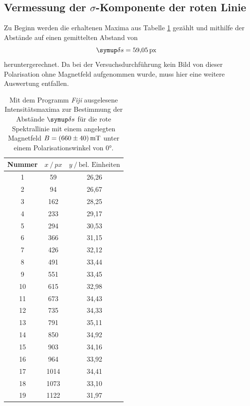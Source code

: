 \subsection{Vermessung der \texorpdfstring{$\sigma$}{sigma}-Komponente der roten Linie}
Zu Beginn werden die erhaltenen Maxima aus Tabelle \ref{tab:sigmarot660mT} gezählt und mithilfe der Abstände auf einen gemittelten Abstand von
\begin{equation}
\deltaup s= \SI{59,05}{px}
\end{equation}
heruntergerechnet. Da bei der Versuchsdurchführung kein Bild von dieser Polarisation ohne Magnetfeld aufgenommen wurde, muss hier eine weitere Auswertung entfallen.

\begin{table}[H]
  \centering
  \caption{Mit dem Programm \textit{Fiji} \cite{Fiji} ausgelesene Intensitätsmaxima zur Bestimmung der Abstände $\deltaup s$ für die rote Spektrallinie mit einem angelegten Magnetfeld $B=\SI{660 \pm 40}{\milli\tesla}$  unter einem Polarisationswinkel von $0°$.}
  \label{tab:sigmarot660mT}
  \begin{tabular}{c|cc}
    \toprule
    {Nummer} & {$x \:/\: \si{px}$} & {$y \:/\: \text{bel. Einheiten}$}\\
    \midrule
 1 &   59  &	 26,26 \\
 2 &   94  &	 26,67 \\
 3 &  162  &	 28,25 \\
 4 &  233  &	 29,17 \\
 5 &  294  &	 30,53 \\
 6 &  366  &	 31,15 \\
 7 &  426  &	 32,12 \\
 8 &  491  &	 33,44 \\
 9 &  551  &  33,45 \\
10 &  615  &	 32,98 \\
11 &  673  &	 34,43 \\
12 &  735  &	 34,33 \\
13 &  791  &	 35,11 \\
14 &  850  &	 34,92 \\
15 &  903  &	 34,16 \\
16 &  964  &	 33,92 \\
17 & 1014  &	 34,41 \\
18 & 1073  &	 33,10 \\
19 & 1122  &	 31,97 \\
  \end{tabular}
\end{table}
